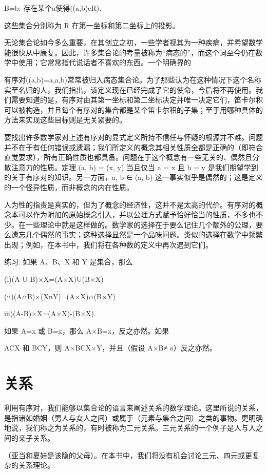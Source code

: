 \documentclass[12pt,a4paper]{ctexbook}
\theoremstyle{definition}
\theoremstyle{remark}
\begin{document}
B={b: 存在某个a使得((a,b)eR)}.

这些集合分别称为 R 在第一坐标和第二坐标上的投影。

无论集合论如今多么重要，在其创立之初，一些学者视其为一种疾病，并希望数学能很快从中康复。因此，许多集合论的考量被称为“病态的”，而这个词至今仍在数学中使用；它常常指代说话者不喜欢的东西。一个明确界的

有序对((a,b)={{a},{a,b}})常常被归入病态集合论。为了那些认为在这种情况下这个名称实至名归的人，我们指出，该定义现在已经完成了它的使命，今后将不再使用。我们需要知道的是，有序对由其第一坐标和第二坐标决定并唯一决定它们，笛卡尔积可以被构造，并且每个有序对的集合都是某个笛卡尔积的子集；至于用哪种具体的方法来实现这些目标则是无关紧要的。

要找出许多数学家对上述有序对的显式定义所持不信任与怀疑的根源并不难。问题并不在于有任何错误或遗漏；我们所定义的概念其相关性质全都是正确的（即符合直觉要求），所有正确性质也都具备。问题在于这个概念有一些无关的、偶然且分散注意力的性质。定理 (a, b) = (x, y) 当且仅当 a = x 且 b = y 是我们期望学到的关于有序对的知识。另一方面，{a, b} ∈ (a, b) 这一事实似乎是偶然的；这是定义的一个怪异性质，而非概念的内在性质。

人为性的指责是真实的，但为了概念的经济性，这并不是太高的代价。有序对的概念本可以作为附加的原始概念引入，并以公理方式赋予恰好恰当的性质，不多也不少。在一些理论中就是这样做的。数学家的选择在于要么记住几个额外的公理，要么遗忘几个偶然的事实；这种选择显然是一个品味问题。类似的选择在数学中频繁出现；例如，在本书中，我们将在各种数的定义中再次遇到它们。

练习. 如果 A、B、X 和 Y 是集合，那么

(i)(A U B)×X=(A×X)U(B×X)

(ii)(A∩B)×(XnY)=(A×X)∩(B×Y)

iii)(A-B)×X=(A×X)-(B×X).

如果 A=x 或 B=x，那么 A×B=x，反之亦然。如果

ACX 和 BCY，则 A×BCX×Y，并且（假设 A×B≠ ø）反之亦然。


\chapter{关系}

利用有序对，我们能够以集合论的语言来阐述关系的数学理论。这里所说的关系，是指诸如婚姻（男人与女人之间）或属于（元素与集合之间）之类的事物。更明确地说，我们称之为关系的，有时被称为二元关系。三元关系的一个例子是人与人之间的亲子关系。

（亚当和夏娃是该隐的父母）。在本书中，我们将没有机会讨论三元、四元或更复杂的关系理论。
\end{document}

